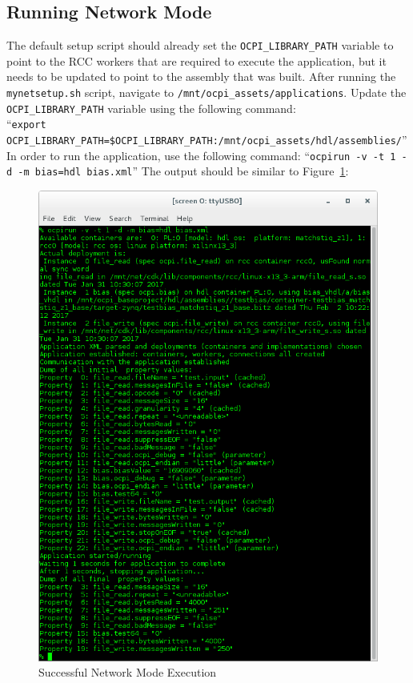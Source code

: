 \subsection{Running Network Mode}
The default setup script should already set the \texttt{OCPI\_LIBRARY\_PATH} variable to point to the RCC workers that are required to execute the application, but it needs to be updated to point to the assembly that was built.  After running the \texttt{mynetsetup.sh} script, navigate to  \texttt{/mnt/ocpi\_assets/applications}. Update the \texttt{OCPI\_LIBRARY\_PATH} variable using the following command: \\ ``\texttt{export OCPI\_LIBRARY\_PATH=\$OCPI\_LIBRARY\_PATH:/mnt/ocpi\_assets/hdl/assemblies/}''
In order to run the application, use the following command: ``\texttt{ocpirun -v -t 1 -d -m bias=hdl bias.xml}'' The output should be similar to Figure~\ref{fig:netBias}:
\begin{figure}[H]
	\centerline{\includegraphics[scale=0.5]{Matchstiq_Z1_net_bias}}
	\caption{Successful Network Mode Execution}
	\label{fig:netBias}
\end{figure}

